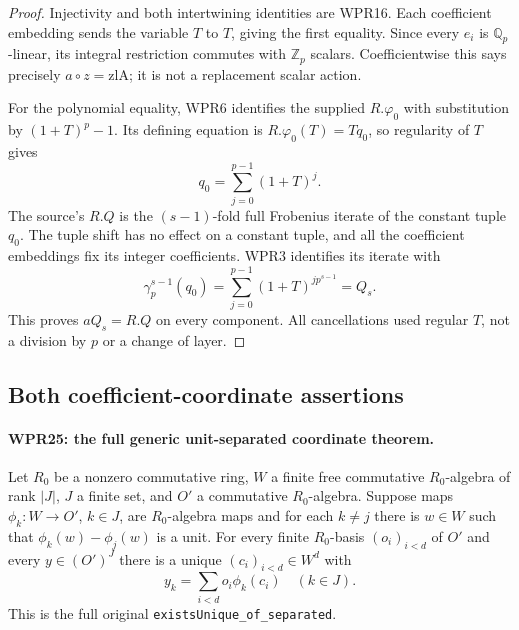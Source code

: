 \begin{proof}
Injectivity and both intertwining identities are WPR16.
Each coefficient embedding sends the variable $T$ to $T$,
giving the first equality. Since every $e_i$ is
$\mathbb Q_p$-linear, its integral restriction commutes with
$\mathbb Z_p$ scalars. Coefficientwise this says precisely
$a\circ z=\mathrm{zlA}$; it is not a replacement scalar action.

For the polynomial equality, WPR6 identifies the supplied
$R.\varphi_0$ with substitution by $(1+T)^p-1$. Its defining
equation is $R.\varphi_0(T)=Tq_0$, so regularity of $T$ gives
\[
                     q_0=\sum_{j=0}^{p-1}(1+T)^j.
\]
The source's $R.Q$ is the $(s-1)$-fold full Frobenius iterate
of the constant tuple $q_0$. The tuple shift has no effect on
a constant tuple, and all the coefficient embeddings fix its
integer coefficients. WPR3 identifies its iterate with
\[
 \gamma_p^{s-1}(q_0)
   =\sum_{j=0}^{p-1}(1+T)^{j p^{s-1}}=Q_s.
\]
This proves $aQ_s=R.Q$ on every component. All cancellations
used regular $T$, not a division by $p$ or a change of layer.
\end{proof}

\subsection{Both coefficient-coordinate assertions}

\paragraph{WPR25: the full generic unit-separated coordinate theorem.}
\label{claim:WPR25}
Let $R_0$ be a nonzero commutative ring, $W$ a finite free
commutative $R_0$-algebra of rank $|J|$, $J$ a finite set,
and $O'$ a commutative $R_0$-algebra. Suppose maps
$\phi_k:W\to O'$, $k\in J$, are $R_0$-algebra maps and
for each $k\ne j$ there is $w\in W$ such that
$\phi_k(w)-\phi_j(w)$ is a unit. For every finite
$R_0$-basis $(o_i)_{i<d}$ of $O'$ and every $y\in(O')^J$
there is a unique $(c_i)_{i<d}\in W^d$ with
\[
                    y_k=\sum_{i<d}o_i\phi_k(c_i)
                    \quad(k\in J).                         \tag{WPR.30}
\]
This is the full original \texttt{existsUnique\_of\_separated}.

